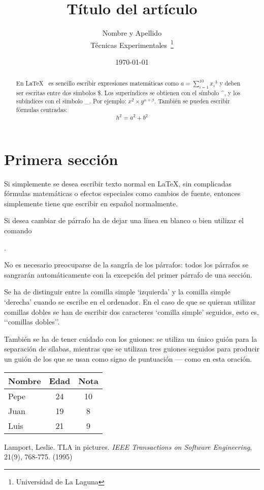 \documentclass[a4paper,12pt]{article}
\begin{document}
\title{Título del artículo}
 \author{Nombre y Apellido \\
 Técnicas Experimentales~\footnote{Universidad de La Laguna}
 }
 \date{\today}
 \maketitle
 \begin{abstract}
 En \LaTeX{}~\cite{Lam:86} es sencillo escribir expresiones
 matemáticas como $a=\sum_{i=1}^{10} {x_i}^{3}$
 y deben ser escritas entre dos símbolos \$.
 Los superíndices se obtienen con el símbolo \^{}, y
 los subíndices con el símbolo \_.
 Por ejemplo: $x^2 \times y^{\alpha + \beta}$.
 También se pueden escribir fórmulas centradas:
 \[h^2=a^2 + b^2 \]
 \end{abstract}
 
\section{Primera sección}
 Si simplemente se desea escribir texto normal en LaTeX,
 sin complicadas f\'ormulas matem\'aticas o efectos especiales
 como cambios de fuente, entonces simplemente tiene que escribir
 en espa\~nol normalmente.\par
 Si desea cambiar de párrafo ha de dejar una línea en blanco o bien
 utilizar el comando \par.
 
 No es necesario preocuparse de la sangría de los párrafos:
 todos los párrafos se sangrarán automáticamente con la excepción
 del primer párrafo de una sección.
 
 Se ha de distinguir entre la comilla simple ‘izquierda’
 y la comilla simple ‘derecha’ cuando se escribe en el ordenador.
 En el caso de que se quieran utilizar comillas dobles se han de
 escribir dos caracteres ‘comilla simple’ seguidos, esto es,
 ‘‘co\-mi\-llas dobles’’.
 
 También se ha de tener cuidado con los guiones: se utiliza un único
 guión para la separación de sílabas, mientras que se utilizan
 tres guiones seguidos para producir un guión de los que se usan
 como signo de puntuación --- como en esta oración.
 
\bigskip
\begin{tabular}{|l|c|c|}
\hline
Nombre & Edad & Nota \\ \hline
Pepe & 24 & 10 \\ \hline
Juan & 19 & 8 \\ \hline
Luis & 21 & 9 \\ \hline
\end{tabular}
 
  \begin{thebibliography}{00}
 Lamport, Leslie.
 TLA in pictures.
 \emph{IEEE Transactions on Software Engineering},
 21(9), 768-775.
 (1995)
 \end{thebibliography}
 
\end{document}
